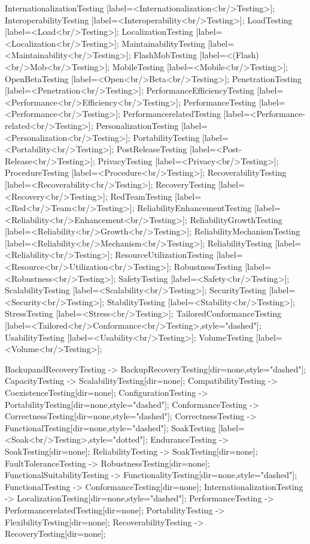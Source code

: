 \documentclass{article}
\begin{document}
{InternationalizationTesting [label=<Internationalization<br/>Testing>];
InteroperabilityTesting [label=<Interoperability<br/>Testing>];
LoadTesting [label=<Load<br/>Testing>];
LocalizationTesting [label=<Localization<br/>Testing>];
MaintainabilityTesting [label=<Maintainability<br/>Testing>];
FlashMobTesting [label=<(Flash)<br/>Mob<br/>Testing>];
MobileTesting [label=<Mobile<br/>Testing>];
OpenBetaTesting [label=<Open<br/>Beta<br/>Testing>];
PenetrationTesting [label=<Penetration<br/>Testing>];
PerformanceEfficiencyTesting [label=<Performance<br/>Efficiency<br/>Testing>];
PerformanceTesting [label=<Performance<br/>Testing>];
PerformancerelatedTesting [label=<Performance-related<br/>Testing>];
PersonalizationTesting [label=<Personalization<br/>Testing>];
PortabilityTesting [label=<Portability<br/>Testing>];
PostReleaseTesting [label=<Post-Release<br/>Testing>];
PrivacyTesting [label=<Privacy<br/>Testing>];
ProcedureTesting [label=<Procedure<br/>Testing>];
RecoverabilityTesting [label=<Recoverability<br/>Testing>];
RecoveryTesting [label=<Recovery<br/>Testing>];
RedTeamTesting [label=<Red<br/>Team<br/>Testing>];
ReliabilityEnhancementTesting [label=<Reliability<br/>Enhancement<br/>Testing>];
ReliabilityGrowthTesting [label=<Reliability<br/>Growth<br/>Testing>];
ReliabilityMechanismTesting [label=<Reliability<br/>Mechanism<br/>Testing>];
ReliabilityTesting [label=<Reliability<br/>Testing>];
ResourceUtilizationTesting [label=<Resource<br/>Utilization<br/>Testing>];
RobustnessTesting [label=<Robustness<br/>Testing>];
SafetyTesting [label=<Safety<br/>Testing>];
ScalabilityTesting [label=<Scalability<br/>Testing>];
SecurityTesting [label=<Security<br/>Testing>];
StabilityTesting [label=<Stability<br/>Testing>];
StressTesting [label=<Stress<br/>Testing>];
TailoredConformanceTesting [label=<Tailored<br/>Conformance<br/>Testing>,style="dashed"];
UsabilityTesting [label=<Usability<br/>Testing>];
VolumeTesting [label=<Volume<br/>Testing>];

BackupandRecoveryTesting -> BackupRecoveryTesting[dir=none,style="dashed"];
CapacityTesting -> ScalabilityTesting[dir=none];
CompatibilityTesting -> CoexistenceTesting[dir=none];
ConfigurationTesting -> PortabilityTesting[dir=none,style="dashed"];
ConformanceTesting -> CorrectnessTesting[dir=none,style="dashed"];
CorrectnessTesting -> FunctionalTesting[dir=none,style="dashed"];
SoakTesting [label=<Soak<br/>Testing>,style="dotted"];
EnduranceTesting -> SoakTesting[dir=none];
ReliabilityTesting -> SoakTesting[dir=none];
FaultToleranceTesting -> RobustnessTesting[dir=none];
FunctionalSuitabilityTesting -> FunctionalityTesting[dir=none,style="dashed"];
FunctionalTesting -> ConformanceTesting[dir=none];
InternationalizationTesting -> LocalizationTesting[dir=none,style="dashed"];
PerformanceTesting -> PerformancerelatedTesting[dir=none];
PortabilityTesting -> FlexibilityTesting[dir=none];
RecoverabilityTesting -> RecoveryTesting[dir=none];

}
\end{document}

